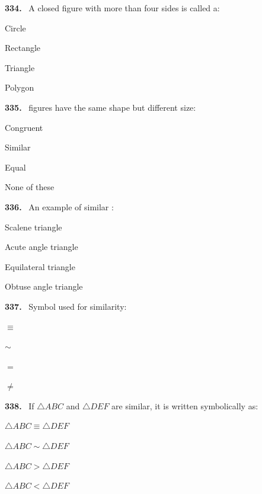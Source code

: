 \documentclass[11pt]{article}
\newenvironment{qenv}[1]{%
  \par\medskip\noindent\textbf{#1.}\ \ignorespaces
}{\par}
\begin{document}
\begin{qenv}{334} A closed figure with more than four sides is called a:
\begin{options} \item Circle \item Rectangle \item Triangle \item Polygon \end{options} \end{qenv}

\begin{qenv}{335} \underline{\hspace{2cm}} figures have the same shape but different size:
\begin{options} \item Congruent \item Similar \item Equal \item None of these \end{options} \end{qenv}

\begin{qenv}{336} An example of similar \underline{\hspace{2cm}}:
\begin{options} \item Scalene triangle \item Acute angle triangle \item Equilateral triangle \item Obtuse angle triangle \end{options} \end{qenv}

\begin{qenv}{337} Symbol used for similarity:
\begin{options} \item $\equiv$ \item $\sim$ \item $=$ \item $\neq$ \end{options} \end{qenv}

\begin{qenv}{338} If $\triangle ABC$ and $\triangle DEF$ are similar, it is written symbolically as:
\begin{options} \item $\triangle ABC \equiv \triangle DEF$ \item $\triangle ABC \sim \triangle DEF$ \item $\triangle ABC > \triangle DEF$ \item $\triangle ABC < \triangle DEF$ \end{options} \end{qenv}
\end{document}
